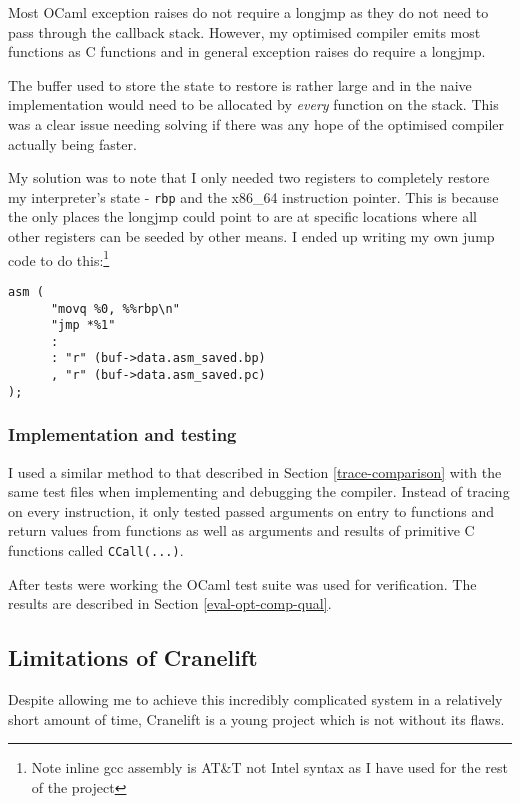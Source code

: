 Most OCaml exception raises do not require a longjmp as they do not need to pass through
the callback stack. However, my optimised compiler emits most functions as C functions and in
general exception raises do require a longjmp.

The buffer used to store the state to restore is rather large and in the naive implementation would
need to be allocated by \emph{every} function on the stack. This was a clear issue needing solving
if there was any hope of the optimised compiler actually being faster.

My solution was to note that I only needed two registers to completely restore my interpreter's
state - \texttt{rbp} and the x86\_64 instruction pointer. This is because the only places the
longjmp could point to are at specific locations where all other registers can be seeded by other
means. I ended up writing my own jump code to do this:\footnote{Note inline gcc assembly is AT\&T
      not Intel
      syntax as I have used for the rest of the project}

\begin{verbatim}
asm (
      "movq %0, %%rbp\n"
      "jmp *%1"
      :
      : "r" (buf->data.asm_saved.bp)
      , "r" (buf->data.asm_saved.pc)
);
\end{verbatim}

\subsubsection{Implementation and testing}

I used a similar method to that described in Section \ref{trace-comparison} with the same test
files
when implementing and debugging the compiler. Instead of tracing on every instruction, it only
tested
passed arguments on entry to functions and return values from functions as well as arguments and
results of
primitive C functions called \texttt{CCall(...)}.

After tests were working the OCaml test suite was used for verification. The results are described
in Section
\ref{eval-opt-comp-qual}.

\subsection{Limitations of Cranelift}

Despite allowing me to achieve this incredibly complicated system in a relatively short amount of
time, Cranelift is a young project which is not without its flaws.

